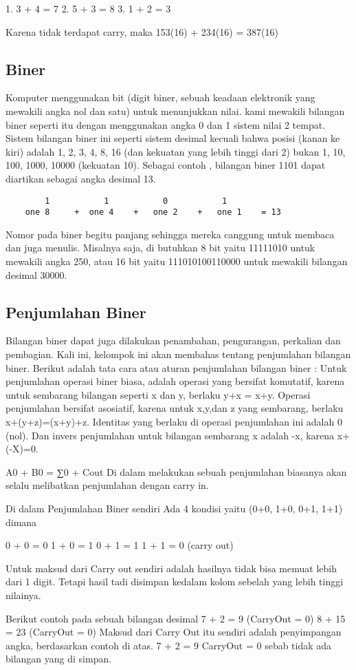 1. 3 + 4 = 7
2. 5 + 3 = 8
3. 1 + 2 = 3

Karena tidak terdapat carry, maka 153(16) + 234(16) = 387(16)


\subsection {Biner}
Komputer menggunakan bit (digit biner, sebuah keadaan elektronik yang mewakili angka nol dan satu) untuk menunjukkan nilai. kami mewakili bilangan biner seperti itu dengan menggunakan angka 0 dan 1 sistem nilai 2 tempat. Sistem bilangan biner ini seperti sistem desimal kecuali bahwa posisi (kanan ke kiri) adalah 1, 2, 3, 4, 8, 16 (dan kekuatan yang lebih tinggi dari 2) bukan 1, 10, 100, 1000, 10000 (kekuatan 10). Sebagai contoh , bilangan biner 1101 dapat diartikan sebagai angka desimal 13.
	\begin{verbatim}
		1			1			0			1
	one 8	  +	 one 4	  +	  one 2    +   one 1 	= 13
	\end{verbatim}
Nomor pada  biner begitu panjang sehingga mereka canggung  untuk membaca dan juga menulis. Misalnya saja, di butuhkan 8 bit yaitu  11111010 untuk mewakili angka 250, atau 16 bit yaitu 111010100110000 untuk mewakili bilangan desimal 30000.


\subsection {Penjumlahan Biner}
Bilangan biner dapat juga dilakukan penambahan, pengurangan, perkalian dan pembagian. Kali ini, kelompok ini akan membahas tentang penjumlahan bilangan biner. Berikut adalah tata cara atau aturan penjumlahan bilangan biner :
Untuk penjumlahan operasi biner biasa, adalah operasi yang bersifat komutatif, karena untuk sembarang bilangan seperti x dan y, berlaku y+x = x+y. Operasi penjumlahan bersifat asosiatif, karena untuk x,y,dan z yang sembarang, berlaku x+(y+z)=(x+y)+z. Identitas yang berlaku di operasi penjumlahan ini adalah 0 (nol). Dan invers penjumlahan untuk bilangan sembarang x adalah -x, karena x+(-X)=0.

A0 + B0 = ∑0 + Cout
Di dalam melakukan sebuah penjumlahan biasanya akan selalu melibatkan penjumlahan dengan carry in.

Di dalam Penjumlahan Biner sendiri Ada 4 kondisi yaitu
(0+0, 1+0, 0+1, 1+1) dimana

0 + 0 = 0
1 + 0 = 1
0 + 1 = 1
1 + 1 = 0 (carry out) 

Untuk maksud dari Carry out sendiri adalah hasilnya tidak bisa memuat lebih dari 1 digit. Tetapi  hasil tadi disimpan kedalam kolom sebelah yang lebih tinggi nilainya.

Berikut contoh pada sebuah bilangan desimal
7 + 2 = 9 (CarryOut = 0)
8 + 15 = 23 (CarryOut = 0)
Maksud dari Carry Out itu sendiri adalah penyimpangan angka, berdasarkan contoh di atas. 7 + 2 = 9 CarryOut = 0 sebab tidak ada bilangan yang di simpan. 
